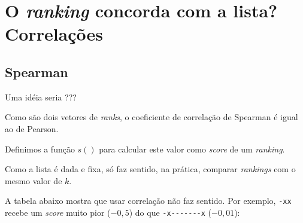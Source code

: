 \documentclass[
  letterpaper,
  DIV=11,
  numbers=noendperiod]{scrreprt}
\begin{document}

\chapter{\texorpdfstring{O \emph{ranking} concorda com a lista?
Correlações}{O ranking concorda com a lista? Correlações}}\label{o-ranking-concorda-com-a-lista-correlauxe7uxf5es}

\section{Spearman}\label{spearman}

Uma idéia seria ???

Como são dois vetores de \emph{ranks}, o coeficiente de correlação de
Spearman é igual ao de Pearson.

Definimos a função $s()$ para calcular este valor como \emph{score} de
um \emph{ranking}.

Como a lista é dada e fixa, só faz sentido, na prática, comparar
\emph{rankings} com o mesmo valor de $k$.

A tabela abaixo mostra que usar correlação não faz sentido. Por exemplo,
\texttt{-xx} recebe um \emph{score} muito pior ($-0{,}5$) do que
\texttt{-x-\/-\/-\/-\/-\/-\/-x} ($-0{,}01$):
\end{document}

